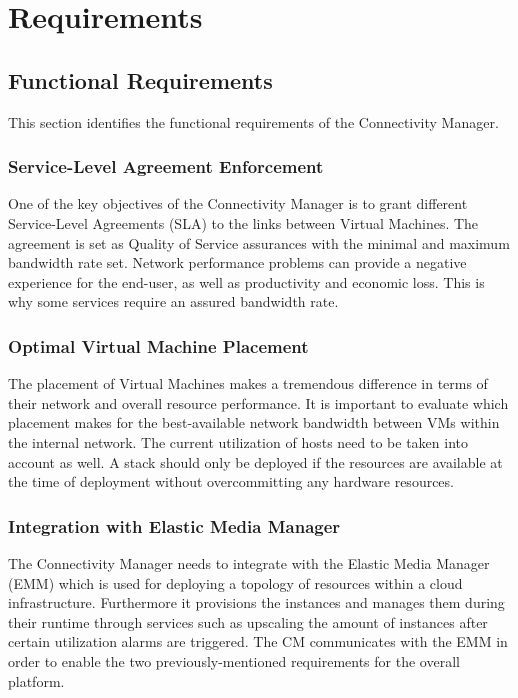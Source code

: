 \chapter{Requirements}

\section{Functional Requirements}

This section identifies the functional requirements of the Connectivity Manager.

\subsection{Service-Level Agreement Enforcement}

One of the key objectives of the Connectivity Manager is to grant different Service-Level Agreements (SLA) to the links between Virtual Machines. The agreement is set as Quality of Service assurances with the minimal and maximum bandwidth rate set. Network performance problems can provide a negative experience for the end-user, as well as productivity and economic loss. This is why some services require an assured bandwidth rate.

\subsection{Optimal Virtual Machine Placement}

The placement of Virtual Machines makes a tremendous difference in terms of their network and overall resource performance. It is important to evaluate which placement makes for the best-available network bandwidth between VMs within the internal network. The current utilization of hosts need to be taken into account as well. A stack should only be deployed if the resources are available at the time of deployment without overcommitting any hardware resources.

\subsection{Integration with Elastic Media Manager}

The Connectivity Manager needs to integrate with the Elastic Media Manager (EMM) which is used for deploying a topology of resources within a cloud infrastructure. Furthermore it provisions the instances and manages them during their runtime through services such as upscaling the amount of instances after certain utilization alarms are triggered. The CM communicates with the EMM in order to enable the two previously-mentioned requirements for the overall platform.

